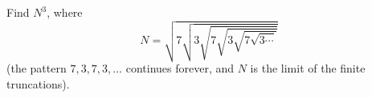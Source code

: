 Find $N^3$, where
\[
N=\sqrt{7\sqrt{3\sqrt{7\sqrt{3\sqrt{7\sqrt{3\cdots}}}}}}
\]
(the pattern $7,3,7,3,\dots$ continues forever, and $N$ is the limit of the finite truncations).

